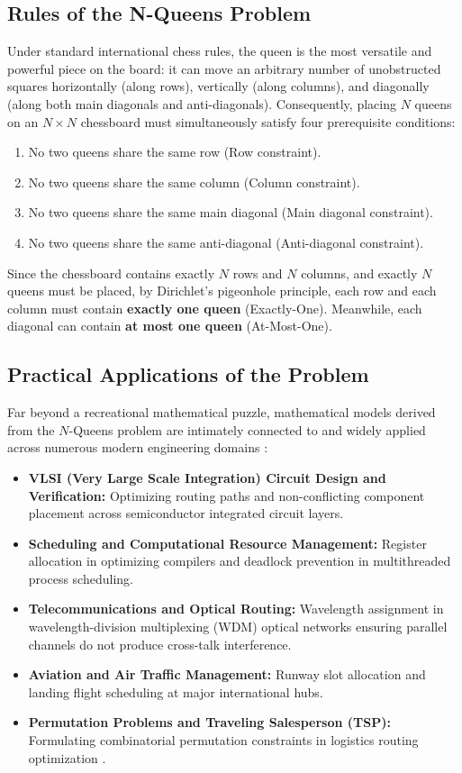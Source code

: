 \documentclass[a4paper,fleqn]{cas-sc}
\begin{document}
\subsection{Rules of the N-Queens Problem}
\label{subsec:rules}
Under standard international chess rules, the queen is the most versatile and powerful piece on the board: it can move an arbitrary number of unobstructed squares horizontally (along rows), vertically (along columns), and diagonally (along both main diagonals and anti-diagonals). Consequently, placing $N$ queens on an $N \times N$ chessboard must simultaneously satisfy four prerequisite conditions:
\begin{enumerate}
    \item No two queens share the same row (Row constraint).
    \item No two queens share the same column (Column constraint).
    \item No two queens share the same main diagonal (Main diagonal constraint).
    \item No two queens share the same anti-diagonal (Anti-diagonal constraint).
\end{enumerate}

Since the chessboard contains exactly $N$ rows and $N$ columns, and exactly $N$ queens must be placed, by Dirichlet's pigeonhole principle, each row and each column must contain \textbf{exactly one queen} (Exactly-One). Meanwhile, each diagonal can contain \textbf{at most one queen} (At-Most-One).

\subsection{Practical Applications of the Problem}
\label{subsec:apps}
Far beyond a recreational mathematical puzzle, mathematical models derived from the $N$-Queens problem are intimately connected to and widely applied across numerous modern engineering domains \cite{sosic1994polynomial,erbas1992queens}:
\begin{itemize}
    \item \textbf{VLSI (Very Large Scale Integration) Circuit Design and Verification:} Optimizing routing paths and non-conflicting component placement across semiconductor integrated circuit layers.
    \item \textbf{Scheduling and Computational Resource Management:} Register allocation in optimizing compilers and deadlock prevention in multithreaded process scheduling.
    \item \textbf{Telecommunications and Optical Routing:} Wavelength assignment in wavelength-division multiplexing (WDM) optical networks ensuring parallel channels do not produce cross-talk interference.
    \item \textbf{Aviation and Air Traffic Management:} Runway slot allocation and landing flight scheduling at major international hubs.
    \item \textbf{Permutation Problems and Traveling Salesperson (TSP):} Formulating combinatorial permutation constraints in logistics routing optimization \cite{hoffman2013traveling}.
\end{itemize}
\end{document}
